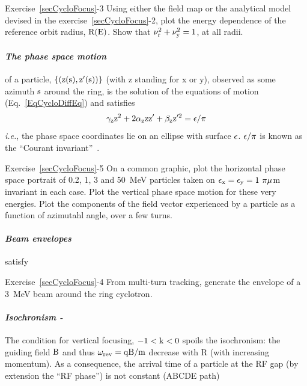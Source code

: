 \smallskip
\noindent {\small $\bullet$} Exercise~\ref{secCycloFocus}-3
Using either the field map or the analytical model devised in the  exercise~\ref{secCycloFocus}-2, 
 plot the energy dependence of the reference orbit radius, $\rm R(E)$. 
Show that $\rm \nu_r^2 + \nu_y^2=1$, at all radii.


\paragraph{\sl The phase space motion  \label{secCycloPhasSpac} } of a particle,
$\rm \{(z(s),z'(s))\}$ (with z standing for x or y), observed as some azimuth $\rm s$ around the ring,  
 is the solution of the equations of motion (Eq.~\ref{EqCycloDiffEq}) and satisfies 
\begin{equation} \rm
\label{EqCycloInvariant}
\rm
\gamma_z z^2 + 2 \alpha_z z z' + \beta_z z'^2 = \epsilon/\pi
\end{equation}
{\sl i.e.}, the phase space coordinates lie on an ellipse with surface $\rm \epsilon$.  
$\rm \epsilon/\pi$ is known as the ``Courant invariant''~\cite{Courant}. 


\smallskip
\noindent {\small $\bullet$} Exercise~\ref{secCycloFocus}-5
On a common graphic, plot the horizontal phase space portrait of 0.2, 1, 3 and 50~MeV particles
taken on $\rm \epsilon_x = \epsilon_y = 1\ \pi\mu$m invariant in each case.
Plot the vertical phase space motion for these very energies. 
Plot the components of the field vector experienced by a particle as a function of 
azimutahl angle, over a few turns.



\paragraph{\sl Beam envelopes  \label{secCycloEnvlps} }
satisfy 

\smallskip
\noindent {\small $\bullet$} Exercise~\ref{secCycloFocus}-4
From multi-turn tracking, generate the envelope of a 3~MeV beam around the ring cyclotron.  


\paragraph{\sl Isochronism  \label{secCycloIsochro} - }  
The  condition  for vertical focusing, $\rm -1 < k <0$ 
spoils the isochronism: the guiding field $\rm B$ and thus $\rm \omega_{\rm rev} = qB/m$ decrease with R (with increasing momentum). 
 As a consequence, the arrival time of a particle at the RF gap (by 
extension the ``RF phase'') is not constant  (ABCDE path)


